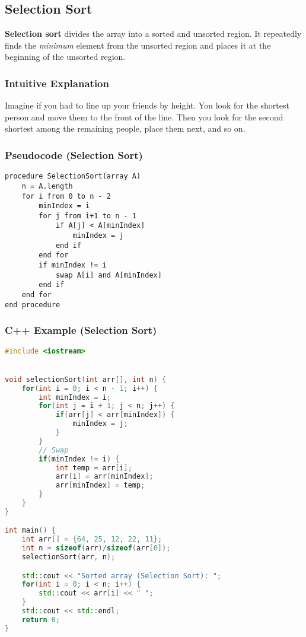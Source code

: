 \documentclass[a4paper,12pt]{article}
\begin{document}
\subsection{Selection Sort}
\textbf{Selection sort} divides the array into a sorted and unsorted region. It repeatedly finds the \emph{minimum} element from the unsorted region and places it at the beginning of the unsorted region.

\subsubsection*{Intuitive Explanation}
Imagine if you had to line up your friends by height. You look for the shortest person and move them to the front of the line. Then you look for the second shortest among the remaining people, place them next, and so on.

\subsubsection*{Pseudocode (Selection Sort)}
\begin{verbatim}
procedure SelectionSort(array A)
    n = A.length
    for i from 0 to n - 2
        minIndex = i
        for j from i+1 to n - 1
            if A[j] < A[minIndex]
                minIndex = j
            end if
        end for
        if minIndex != i
            swap A[i] and A[minIndex]
        end if
    end for
end procedure
\end{verbatim}

\subsubsection*{C++ Example (Selection Sort)}
\begin{lstlisting}[language=C++]
#include <iostream>


void selectionSort(int arr[], int n) {
    for(int i = 0; i < n - 1; i++) {
        int minIndex = i;
        for(int j = i + 1; j < n; j++) {
            if(arr[j] < arr[minIndex]) {
                minIndex = j;
            }
        }
        // Swap
        if(minIndex != i) {
            int temp = arr[i];
            arr[i] = arr[minIndex];
            arr[minIndex] = temp;
        }
    }
}

int main() {
    int arr[] = {64, 25, 12, 22, 11};
    int n = sizeof(arr)/sizeof(arr[0]);
    selectionSort(arr, n);

    std::cout << "Sorted array (Selection Sort): ";
    for(int i = 0; i < n; i++) {
        std::cout << arr[i] << " ";
    }
    std::cout << std::endl;
    return 0;
}
\end{lstlisting}
\end{document}
